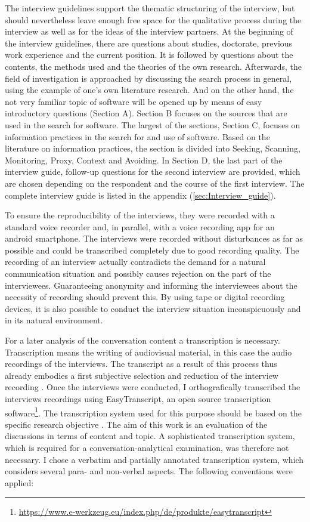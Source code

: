 \documentclass[12pt, a4paper, titlepage, oneside, abstract=true, toc=listof, toc=bibliography]{scrreprt}
\begin{document}
The interview guidelines support the thematic structuring of the interview, but should nevertheless leave enough free space for the qualitative process during the interview as well as for the ideas of the interview partners. At the beginning of the interview guidelines, there are questions about studies, doctorate, previous work experience and the current position. It is followed by questions about the contents, the methods used and the theories of the own research. Afterwards, the field of investigation is approached by discussing the search process in general, using the example of one's own literature research. And on the other hand, the not very familiar topic of software will be opened up by means of easy introductory questions (Section A).  Section B focuses on the sources that are used in the search for software. The largest of the sections, Section C, focuses on information practices in the search for and use of software. Based on the literature on information practices, the section is divided into Seeking, Scanning, Monitoring, Proxy, Context and Avoiding. In Section D, the last part of the interview guide, follow-up questions for the second interview are provided, which are chosen depending on the respondent and the course of the first interview. The complete interview guide is listed in the appendix (\ref{sec:Interview_guide}).

To ensure the reproducibility of the interviews, they were recorded with a standard voice recorder and, in parallel, with a voice recording app for an android smartphone. The interviews were recorded without disturbances as far as possible and could be transcribed completely due to good recording quality. The recording of an interview actually contradicts the demand for a natural communication situation and possibly causes rejection on the part of the interviewees. Guaranteeing anonymity and informing the interviewees about the necessity of recording should prevent this. By using tape or digital recording devices, it is also possible to conduct the interview situation inconspicuously and in its natural environment.

For a later analysis of the conversation content a transcription is necessary. Transcription means the writing of audiovisual material, in this case the audio recordings of the interviews. The transcript as a result of this process thus already embodies a first subjective selection and reduction of the interview recording \citep[p. 321]{Edwards2003}. Once the interviews were conducted, I orthografically transcribed the interviews recordings using EasyTranscript, an open source transcription software\footnote{\url{https://www.e-werkzeug.eu/index.php/de/produkte/easytranscript}}. The transcription system used for this purpose should be based on the specific research objective \citep[p. 331]{Edwards2003}. The aim of this work is an evaluation of the discussions in terms of content and topic. A sophisticated transcription system, which is required for a conversation-analytical examination, was therefore not necessary. I chose a verbatim and partially annotated transcription system, which considers several para- and non-verbal aspects. The following conventions were applied:
\end{document}
